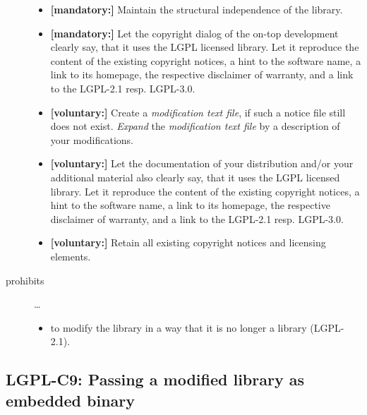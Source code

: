 \begin{description}
\begin{itemize}
  \item \textbf{[mandatory:]}  Maintain the structural independence of the
  library.
   
  \item \textbf{[mandatory:]} Let the copyright dialog of the on-top development
  clearly say, that it uses the LGPL licensed library. Let it reproduce the
  content of the existing copyright notices, a hint to the software name, a link
  to its homepage, the respective disclaimer of warranty, and a link to the
  LGPL-2.1 resp. LGPL-3.0.
     
  \item \textbf{[voluntary:]} Create a \emph{modification text file}, if such a
  notice file still does not exist. \emph{Expand} the \emph{modification text
  file} by a description of your modifications.
  
 \item \textbf{[voluntary:]} Let the documentation of your distribution and/or
  your additional material also clearly say, that it uses the LGPL licensed
  library. Let it reproduce the content of the existing copyright notices, a
  hint to the software name, a link to its homepage, the respective disclaimer
  of warranty, and a link to the LGPL-2.1 resp. LGPL-3.0.
  
  \item \textbf{[voluntary:]} Retain all existing copyright notices and
  licensing elements.
  
\end{itemize}

\item[prohibits] \ldots
\begin{itemize}
  \item to modify the library in a way that it is no longer a library
  (LGPL-2.1).
\end{itemize}

\end{description}


\subsection{LGPL-C9: Passing a modified library as embedded binary}
\label{OSUC-10B-LGPL}

